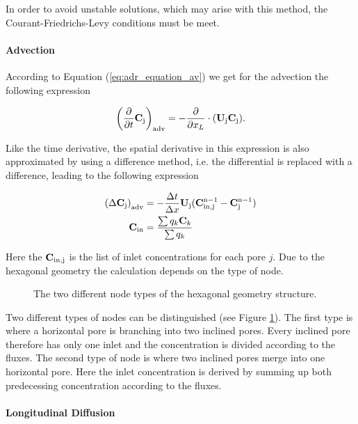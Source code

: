\documentclass[12pt]{report}
\newcommand*{\PsTricksPath}{pstricks}
\begin{document}
In order to avoid unstable solutions, which may arise with this method, the Courant-Friedrichs-Levy conditions must be meet. 

\paragraph*{Advection}

According to Equation (\ref{eq:adr_equation_av}) we get for the advection the following expression

$$
	 \left( \frac{\partial}{\partial t} {\bf C}_{\rm{j}} \right)_{\rm{adv}} = - \frac{\partial}{\partial x_L} \cdot ({\bf U}_{\rm{j}} {\bf C}_{\rm{j}}).
$$

Like the time derivative, the spatial derivative in this expression is also approximated by using a difference method, i.e. the differential is replaced with a difference, leading to the following expression

\begin{subequations}
\begin{align}
	 \left( \Delta {\bf C}_{\rm{j}} \right)_{\rm{adv}} & = - \frac{\Delta t}{ \Delta x } {\bf U}_{\rm{j}} ({\bf C}^{\rm{n} - 1}_{\rm{in, j}} - {\bf C}^{\rm{n} - 1}_{\rm{j}}) \\
	 {\bf C}_{\rm{in}} & = \frac{\sum q_k {\bf C}_k}{ \sum q_k } 
\end{align}
\end{subequations}

Here the ${\bf C}_{\rm{in, j}}$ is the list of inlet concentrations for each pore $j$. Due to the hexagonal geometry the calculation depends on the type of node.

\begin{figure}[ht]
	\centering
	
	\caption{The two different node types of the hexagonal geometry structure.}
	\label{fig:PoreStructure02}
\end{figure}

Two different types of nodes can be distinguished (see Figure \ref{fig:PoreStructure02}). The first type is where a horizontal pore is branching into two inclined pores. Every inclined pore therefore has only one inlet and the concentration is divided according to the fluxes. The second type of node is where two inclined pores merge into one horizontal pore. Here the inlet concentration is derived by summing up both predecessing concentration according to the fluxes.  

\paragraph*{Longitudinal Diffusion}
\end{document}
